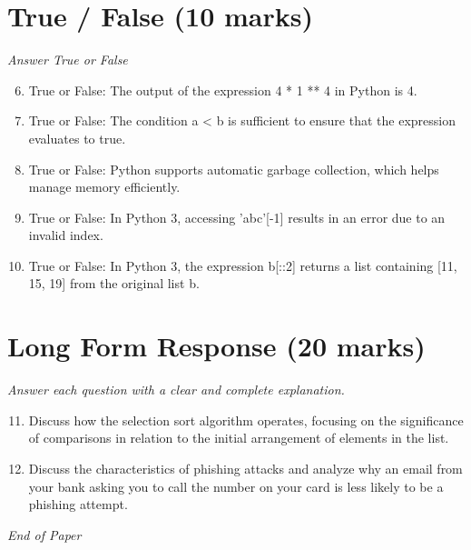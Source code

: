 \documentclass[12pt]{article}
\begin{document}
\section*{True / False (10 marks)}
\textit{Answer True or False}
\begin{enumerate}[label=\arabic*.]
\setcounter{enumi}{5}
\item True or False: The output of the expression 4 * 1 ** 4 in Python is 4.
\item True or False: The condition a \textless{} b is sufficient to ensure that the expression evaluates to true.
\item True or False: Python supports automatic garbage collection, which helps manage memory efficiently.
\item True or False: In Python 3, accessing 'abc'[-1] results in an error due to an invalid index.
\item True or False: In Python 3, the expression b[::2] returns a list containing [11, 15, 19] from the original list b.
\end{enumerate}

\section*{Long Form Response (20 marks)}
\textit{Answer each question with a clear and complete explanation.}
\begin{enumerate}[label=\arabic*.]
\setcounter{enumi}{10}
\item Discuss how the selection sort algorithm operates, focusing on the significance of comparisons in relation to the initial arrangement of elements in the list.
\item Discuss the characteristics of phishing attacks and analyze why an email from your bank asking you to call the number on your card is less likely to be a phishing attempt.
\end{enumerate}

\vfill
\noindent\textit{End of Paper}
\end{document}

